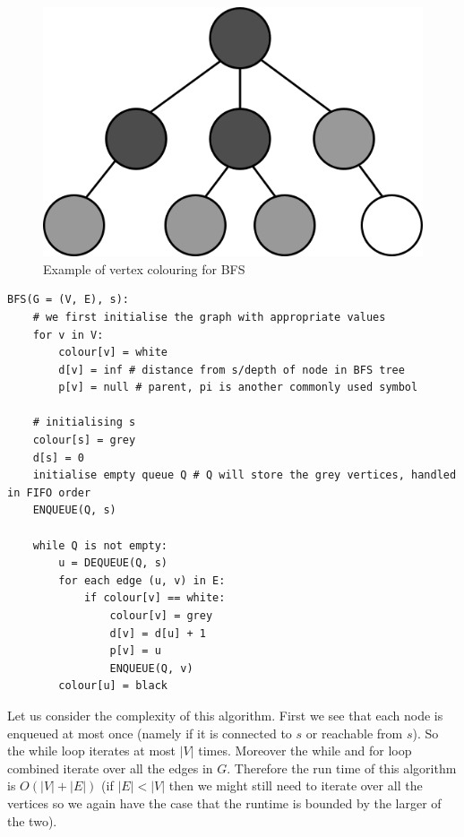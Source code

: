 \begin{figure}[h]
    \centering
    \includegraphics[scale=0.4]{Images/bfs_search.png}
    \caption{Example of vertex colouring for BFS}
    \label{fig:bfs-example}
\end{figure}

\begin{lstlisting}
BFS(G = (V, E), s):
    # we first initialise the graph with appropriate values
    for v in V:
        colour[v] = white
        d[v] = inf # distance from s/depth of node in BFS tree
        p[v] = null # parent, pi is another commonly used symbol
    
    # initialising s
    colour[s] = grey
    d[s] = 0
    initialise empty queue Q # Q will store the grey vertices, handled in FIFO order
    ENQUEUE(Q, s)
    
    while Q is not empty:
        u = DEQUEUE(Q, s)
        for each edge (u, v) in E:
            if colour[v] == white:
                colour[v] = grey
                d[v] = d[u] + 1
                p[v] = u
                ENQUEUE(Q, v)
        colour[u] = black
\end{lstlisting}

Let us consider the complexity of this algorithm. First we see that each node is enqueued at most once (namely if it is connected to $s$ or reachable from $s$). So the while loop iterates at most $|V|$ times. Moreover the while and for loop combined iterate over all the edges in $G$. Therefore the run time of this algorithm is $O(|V| + |E|)$ (if $|E| < |V|$ then we might still need to iterate over all the vertices so we again have the case that the runtime is bounded by the larger of the two).\\

